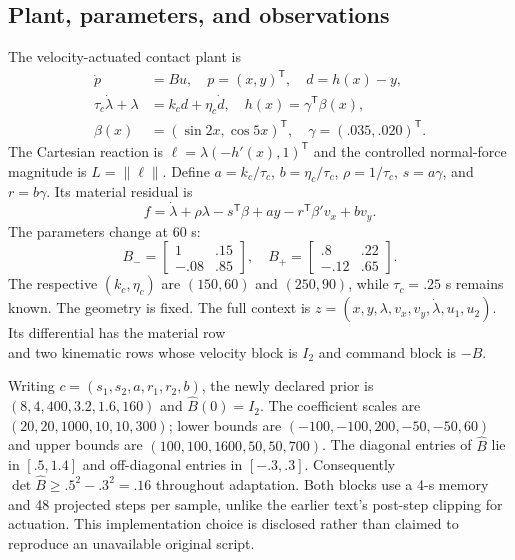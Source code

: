 \documentclass[journal]{IEEEtran}
\begin{document}
\subsection{Plant, parameters, and observations}
The velocity-actuated contact plant is
\begin{align}
 \dot p&=Bu,\quad p=(x,y)^{\mathsf T},\quad d=h(x)-y,\\
 \tau_c\dot\lambda+\lambda&=k_c d+\eta_c\dot d,\quad
 h(x)=\gamma^{\mathsf T}\beta(x),\\
 \beta(x)&=(\sin 2x,\cos 5x)^{\mathsf T},\quad
 \gamma=(.035,.020)^{\mathsf T}.
\end{align}
The Cartesian reaction is $\ell=\lambda(-h'(x),1)^{\mathsf T}$ and the
controlled normal-force magnitude is $L=\|\ell\|$. Define
$a=k_c/\tau_c$, $b=\eta_c/\tau_c$, $\rho=1/\tau_c$,
$s=a\gamma$, and $r=b\gamma$.
Its material residual is
\begin{equation}
 f=\dot\lambda+\rho\lambda-s^{\mathsf T}\beta+ay
       -r^{\mathsf T}\beta'v_x+bv_y.
\end{equation} The parameters change at $60$ s:
\begin{equation}
 B_- =\begin{bmatrix}1&.15\\-.08&.85\end{bmatrix},\quad
 B_+ =\begin{bmatrix}.8&.22\\-.12&.65\end{bmatrix}.
\end{equation}
The respective $(k_c,\eta_c)$ are $(150,60)$ and $(250,90)$, while
$\tau_c=.25$ s remains known. The geometry is fixed. The full context is
$z=(x,y,\lambda,v_x,v_y,\dot\lambda,u_1,u_2)$. Its differential has the material row
\begin{equation}
 [\,-s^{\mathsf T}\beta'-r^{\mathsf T}\beta''v_x,\ a,\rho,
       -r^{\mathsf T}\beta',\ b,\ 1,\ 0,\ 0\,]
\end{equation}
and two kinematic rows whose
velocity block is $I_2$ and command block is $-B$.

Writing $c=(s_1,s_2,a,r_1,r_2,b)$, the newly declared prior is
$(8,4,400,3.2,1.6,160)$ and $\widehat B(0)=I_2$. The coefficient scales are
$(20,20,1000,10,10,300)$; lower bounds are
$(-100,-100,200,-50,-50,60)$ and upper bounds are
$(100,100,1600,50,50,700)$.
The diagonal entries of $\widehat B$ lie in $[.5,1.4]$ and off-diagonal
entries in $[-.3,.3]$. Consequently
$\det\widehat B\ge .5^2-.3^2=.16$ throughout adaptation. Both blocks use a 4-s memory and 48
projected steps per sample, unlike the earlier text's post-step clipping for
actuation. This implementation choice is disclosed rather than claimed to
reproduce an unavailable original script.
\end{document}
